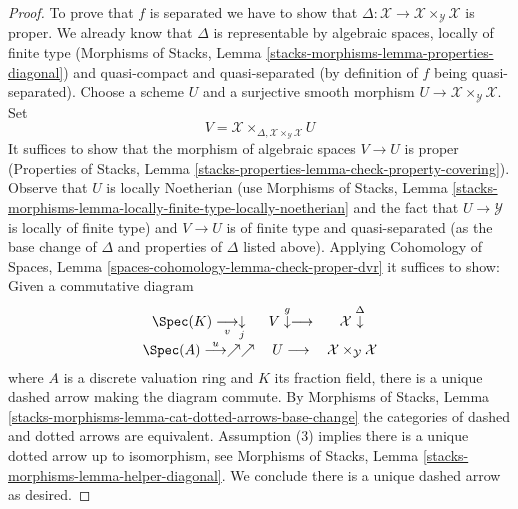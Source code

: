 \begin{proof}
To prove that $f$ is separated we have to show that
$\Delta : \mathcal{X} \to \mathcal{X} \times_\mathcal{Y} \mathcal{X}$
is proper. We already know that $\Delta$ is representable by
algebraic spaces, locally of finite type (Morphisms of Stacks,
Lemma \ref{stacks-morphisms-lemma-properties-diagonal}) and
quasi-compact and quasi-separated (by definition of $f$ being quasi-separated).
Choose a scheme $U$ and a surjective smooth morphism
$U \to \mathcal{X} \times_\mathcal{Y} \mathcal{X}$.
Set
$$
V = \mathcal{X} \times_{\Delta, \mathcal{X} \times_\mathcal{Y} \mathcal{X}} U
$$
It suffices to show that the morphism of algebraic spaces $V \to U$
is proper (Properties of Stacks, Lemma
\ref{stacks-properties-lemma-check-property-covering}).
Observe that $U$ is locally Noetherian
(use Morphisms of Stacks, Lemma
\ref{stacks-morphisms-lemma-locally-finite-type-locally-noetherian}
and the fact that $U \to \mathcal{Y}$ is locally of finite type)
and $V \to U$
is of finite type and quasi-separated (as the base change
of $\Delta$ and properties of $\Delta$ listed above). Applying
Cohomology of Spaces, Lemma \ref{spaces-cohomology-lemma-check-proper-dvr}
it suffices to show: Given a commutative diagram
$$
\begin{array}{ccc}\Spec(K) \underset{v}{\longrightarrow}\underset{j}{\downarrow} & V \overset{g}{\downarrow}\longrightarrow & \mathcal{X} \overset{\Delta}{\downarrow} \\ \Spec(A) \overset{u}{\longrightarrow}\nearrow\nearrow & U \longrightarrow & \mathcal{X} \times_\mathcal{Y} \mathcal{X}\end{array}
$$
where $A$ is a discrete valuation ring and $K$ its fraction field,
there is a unique dashed arrow making the diagram commute.
By Morphisms of Stacks, Lemma
\ref{stacks-morphisms-lemma-cat-dotted-arrows-base-change}
the categories of dashed and dotted arrows are equivalent.
Assumption (3) implies there is a unique dotted arrow up to
isomorphism, see Morphisms of Stacks, Lemma
\ref{stacks-morphisms-lemma-helper-diagonal}. We conclude
there is a unique dashed arrow as desired.
\end{proof}

